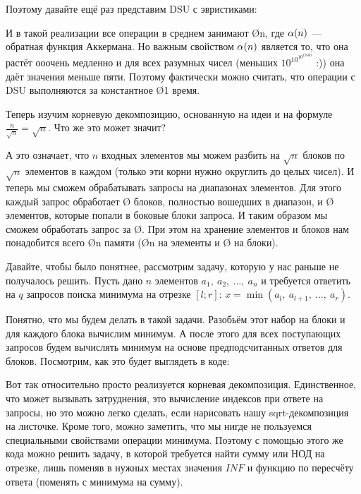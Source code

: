 Поэтому давайте ещё раз представим DSU с эвристиками:

\nocode

И в такой реализации все операции в среднем занимают \O{\ac{n}}, где $\alpha(n)$ — обратная функция Аккермана. Но важным свойством $\alpha(n)$ является то, что она растёт ооочень медленно и для всех разумных чисел (меньших $10^{10^{10^{19500}}}$ :)) она даёт значения меньше пяти. Поэтому фактически можно считать, что операции с DSU выполняются за константное \O{1} время.


Теперь изучим корневую декомпозицию, основанную на идеи  и на формуле $\frac{n}{\sqrt{n}} = \sqrt{n}$. Что же это может значит?

А это означает, что $n$ входных элементов мы можем разбить на $\sqrt{n}$ блоков по $\sqrt{n}$ элементов в каждом (только эти корни нужно округлить до целых чисел). И теперь мы сможем обрабатывать запросы на диапазонах элементов. Для этого каждый запрос обработает \O{} блоков, полностью вошедших в диапазон, и \O{} элементов, которые попали в боковые блоки запроса. И таким образом мы сможем обработать запрос за \O{}. При этом на хранение элементов и блоков нам понадобится всего \O{n} памяти (\O{n} на элементы и \O{} на блоки).

Давайте, чтобы было понятнее, рассмотрим задачу, которую у нас раньше не получалось решить. Пусть дано $n$ элементов $a_1,\ a_2,\ \ldots,\ a_n$ и требуется ответить на $q$ запросов поиска минимума на отрезке $[l; r]$: $x = \min(a_l,\ a_{l + 1},\ \ldots,\ a_r)$.

Понятно, что мы будем делать в такой задачи. Разобьём этот набор на блоки и для каждого блока вычислим минимум. А после этого для всех поступающих запросов будем вычислять минимум на основе предподсчитанных ответов для блоков. Посмотрим, как это будет выглядеть в коде:

\nocode

Вот так относительно просто реализуется корневая декомпозиция. Единственное, что может вызывать затруднения, это вычисление индексов при ответе на запросы, но это можно легко сделать, если нарисовать нашу sqrt-декомпозиция на листочке. Кроме того, можно заметить, что мы нигде не пользуемся специальными свойствами операции минимума. Поэтому с помощью этого же кода можно решить задачу, в которой требуется найти сумму или НОД на отрезке, лишь поменяв в нужных местах значения $INF$ и функцию по пересчёту ответа (поменять с минимума на сумму).

